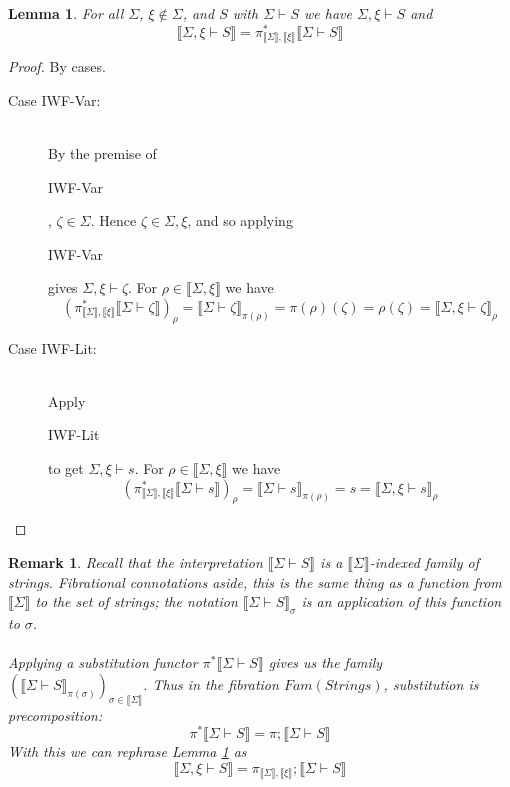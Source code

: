 \documentclass{article}
\newtheorem{lemma}{Lemma}
\newtheorem{remark}{Remark}
\newcommand{\sem}[1]{\llbracket #1 \rrbracket}
\begin{document}
\begin{lemma}
For all $\Sigma$, $\xi \not \in \Sigma$, and $S$ with $\Sigma \vdash S$ we have $\Sigma,\xi \vdash S$ and $$\sem{\Sigma,\xi \vdash S} = \pi_{\sem{\Sigma}, \sem{\xi}}^*\sem{\Sigma \vdash S}$$
\label{lemma:weakiwf}
\end{lemma}
\begin{proof}
By cases.
\begin{description}
\item[Case IWF-Var:]~\\
By the premise of \begin{sc}IWF-Var\end{sc}, $\zeta \in \Sigma$. Hence $\zeta \in \Sigma,\xi$, and so applying \begin{sc}IWF-Var\end{sc} gives $\Sigma,\xi \vdash \zeta$. For $\rho \in \sem{\Sigma,\xi}$ we have
$$(\pi_{\sem{\Sigma}, \sem{\xi}}^*\sem{\Sigma \vdash \zeta})_\rho = \sem{\Sigma \vdash \zeta}_{\pi(\rho)} = \pi(\rho)(\zeta) = \rho(\zeta) = \sem{\Sigma,\xi \vdash \zeta}_{\rho}$$

\item[Case IWF-Lit:]~\\

Apply \begin{sc}IWF-Lit\end{sc} to get $\Sigma,\xi \vdash s$. For $\rho \in \sem{\Sigma,\xi}$ we have $$(\pi_{\sem{\Sigma},\sem{\xi}}^* \sem{\Sigma \vdash s})_\rho = \sem{\Sigma \vdash s}_{\pi(\rho)} = s = \sem{\Sigma,\xi \vdash s}_\rho$$

\end{description}
\end{proof}

\begin{remark}
Recall that the interpretation $\sem{\Sigma \vdash S}$ is a $\sem{\Sigma}$-indexed family of strings. Fibrational connotations aside, this is the same thing as a function from $\sem{\Sigma}$ to the set of strings; the notation $\sem{\Sigma \vdash S}_\sigma$ is an application of this function to $\sigma$.\\~\\
Applying a substitution functor $\pi^* \sem{\Sigma \vdash S}$ gives us the family $(\sem{\Sigma \vdash S}_{\pi(\sigma)})_{\sigma \in \sem{\Sigma}}$. Thus in the fibration $\mathit{Fam}(\mathit{Strings})$, substitution is precomposition: $$\pi^* \sem{\Sigma \vdash S} = \pi;\sem{\Sigma \vdash S}$$ With this we can rephrase Lemma \ref{lemma:weakiwf} as $$\sem{\Sigma,\xi \vdash S} = \pi_{\sem{\Sigma},\sem{\xi}};\sem{\Sigma \vdash S}$$  
\end{remark}
\end{document}
